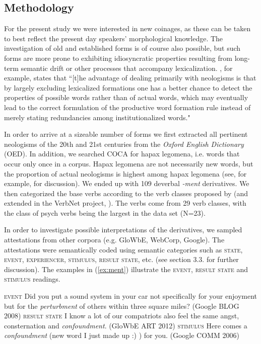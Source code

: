 \documentclass[output=paper]{langsci/langscibook}
\begin{document}
\subsection{Methodology}

For the present study we were interested in new coinages, as these can be taken to best reflect the present day speakers' morphological knowledge. The investigation of old and established forms is of course also possible, but such forms are more prone to exhibiting idiosyncratic properties resulting from long-term semantic drift or other processes that accompany lexicalization. \citet[119]{Plag1999}, for example, states that ``[t]he advantage of dealing primarily with neologisms is that by largely excluding lexicalized formations one has a better chance to detect the properties of possible words rather than of actual words, which may eventually lead to the correct formulation of the productive word formation rule instead of merely stating redundancies among institutionalized words."

In order to arrive at a sizeable number of forms we first extracted all pertinent neologisms of the 20th and 21st centuries from \nocite{OED.2013} the \textit{Oxford English Dictionary} (OED). In addition, we searched COCA for hapax legomena, i.e. words that occur only once in a corpus. Hapax legomena are not necessarily new words, but the proportion of actual neologisms is highest among hapax legomena (see, for example, \citealt[chapter 3.4]{Plag.2003g} for discussion). We ended up with 109 deverbal \textit{-ment} derivatives. We then categorized the base verbs according to the verb classes proposed by \citet{Levin.1993} (and extended in the VerbNet project, \citealt{Kipper.2008}). The verbs come from 29 verb classes, with the class of psych verbs being the largest in the data set (N=23).

In order to investigate possible interpretations of the derivatives, we sampled attestations from other corpora (e.g. GloWbE, WebCorp, Google). The attestations were semantically coded using semantic categories such as \textsc{state}, \textsc{event}, \textsc{experiencer}, \textsc{stimulus}, \textsc{result state}, etc. (see section 3.3. for further discussion). The examples in (\ref{ex:ment}) illustrate the \textsc{event},  \textsc{result state} and \textsc{stimulus} readings.

\begin{exe}
	\ex \label{ex:ment}
	\begin{xlist}
	\ex \textsc{event} Did you put a sound system in your car not specifically for your enjoyment but for the \emph{perturbment} of others within three square miles? (Google BLOG 2008)
	\ex \textsc{result state} I know a lot of our compatriots also feel the same angst, consternation and \emph{confoundment}.  (GloWbE ART 2012)
	\ex \textsc{stimulus} Here comes a \emph{confoundment} (new word I just made up :) ) for you. (Google COMM 2006)
	\end{xlist}
\end{exe}
\end{document}
